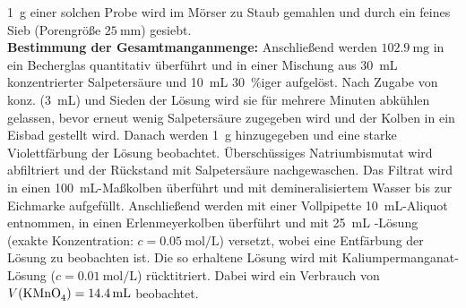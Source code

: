 \documentclass[../kl11.tex]{subfiles}
\begin{document}
\SI{1}{\gram} einer solchen Probe wird im Mörser zu Staub gemahlen und durch ein feines Sieb (Porengröße $\SI{25}{\milli\meter}$) gesiebt.\\
\textbf{Bestimmung der Gesamtmanganmenge:} Anschließend werden $\SI{102,9}{\milli\gram}$ in ein Becherglas quantitativ überführt und in einer Mischung aus \SI{30}{\milli\liter} konzentrierter Salpetersäure und \SI{10}{\milli\liter} \SI{30}{\percent}iger  aufgelöst. Nach Zugabe von konz.  (\SI{3}{\milli\liter}) und Sieden der Lösung wird sie für mehrere Minuten abkühlen gelassen, bevor erneut wenig Salpetersäure zugegeben wird und der Kolben in ein Eisbad gestellt wird. Danach werden \SI{1}{\gram}  hinzugegeben und eine starke Violettfärbung der Lösung beobachtet. Überschüssiges Natriumbismutat wird abfiltriert und der Rückstand mit Salpetersäure nachgewaschen. Das Filtrat wird in einen \SI{100}{\milli\liter}-Maßkolben überführt und mit demineralisiertem Wasser bis zur Eichmarke aufgefüllt. Anschließend werden mit einer Vollpipette \SI{10}{\milli\liter}-Aliquot entnommen, in einen Erlenmeyerkolben überführt und mit \SI{25}{\milli\liter} -Lösung (exakte Konzentration: $c = \SI{0.05}{\mol\per\liter}$) versetzt, wobei eine Entfärbung der Lösung zu beobachten ist. Die so erhaltene Lösung wird mit Kaliumpermanganat-Lösung ($c = \SI{0.01}{\mol\per\liter}$) rücktitriert. Dabei wird ein Verbrauch von $V(\ce{KMnO4}) = \SI{14,4}{\milli\liter}$ beobachtet.
\end{document}
